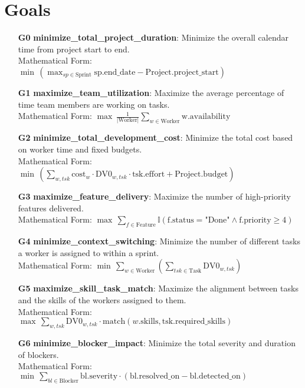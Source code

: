 \documentclass[11pt]{article}
\begin{document}
\section{Goals}
\begin{itemize}
    \item[\textbf{G0}] \textbf{minimize\_total\_project\_duration}: Minimize the overall calendar time from project start to end. \\
    Mathematical Form: $\min\, (\max_{sp \in \text{Sprint}} \text{sp.end\_date} - \text{Project.project\_start})$

    \item[\textbf{G1}] \textbf{maximize\_team\_utilization}: Maximize the average percentage of time team members are working on tasks. \\
    Mathematical Form: $\max\, \frac{1}{|\text{Worker}|} \sum_{w \in \text{Worker}} \text{w.availability}$

    \item[\textbf{G2}] \textbf{minimize\_total\_development\_cost}: Minimize the total cost based on worker time and fixed budgets. \\
    Mathematical Form: $\min\, \left( \sum_{w, tsk} \text{cost}_w \cdot \text{DV0}_{w, tsk} \cdot \text{tsk.effort} + \text{Project.budget} \right)$

    \item[\textbf{G3}] \textbf{maximize\_feature\_delivery}: Maximize the number of high-priority features delivered. \\
    Mathematical Form: $\max\, \sum_{f \in \text{Feature}} \mathbb{I}(\text{f.status} = \text{"Done"} \land \text{f.priority} \geq 4)$

    \item[\textbf{G4}] \textbf{minimize\_context\_switching}: Minimize the number of different tasks a worker is assigned to within a sprint. \\
    Mathematical Form: $\min\, \sum_{w \in \text{Worker}} \left( \sum_{tsk \in \text{Task}} \text{DV0}_{w, tsk} \right)$

    \item[\textbf{G5}] \textbf{maximize\_skill\_task\_match}: Maximize the alignment between tasks and the skills of the workers assigned to them. \\
    Mathematical Form: $\max\, \sum_{w, tsk} \text{DV0}_{w, tsk} \cdot \text{match}(w.\text{skills}, \text{tsk}.\text{required\_skills})$

    \item[\textbf{G6}] \textbf{minimize\_blocker\_impact}: Minimize the total severity and duration of blockers. \\
    Mathematical Form: $\min\, \sum_{bl \in \text{Blocker}} \text{bl.severity} \cdot (\text{bl.resolved\_on} - \text{bl.detected\_on})$


\end{itemize}
\end{document}
